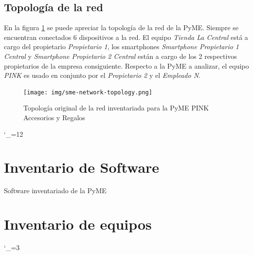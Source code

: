 \documentclass[10pt]{article}
\begin{document}

        \subsection{Topología de la red}

            En la figura \ref{fig:pink-network-topology} se puede apreciar la topología de la red de la PyME. Siempre se encuentran conectados 6 dispositivos a la red. El equipo \emph{Tienda La Central} está a cargo del propietario \emph{Propietario 1}, los smartphones \emph{Smartphone Propietario 1 Central} y \emph{Smartphone Propietario 2 Central} están a cargo de los 2 respectivos propietarios de la empresa consiguiente. Respecto a la PyME a analizar, el equipo \emph{PINK} es usado en conjunto por el \emph{Propietario 2} y el \emph{Empleado N}.

            \begin{figure}[h!]
                \centering
                \texttt{[image: img/sme-network-topology.png]}\\ %
                \caption{Topología original de la red inventariada para la PyME PINK Accesorios y Regalos}
                \label{fig:pink-network-topology}
            \end{figure}

    \appendix
    \catcode`\_=12%
    \section{Inventario de Software}
        \begin{landscape}
            \begin{table}[h!]
                \centering
                \caption{Software inventariado de la PyME}
                \label{table:software-pyme}
            \end{table}
        \end{landscape}

    \section{Inventario de equipos}


    \catcode`\_=3%
\end{document}
